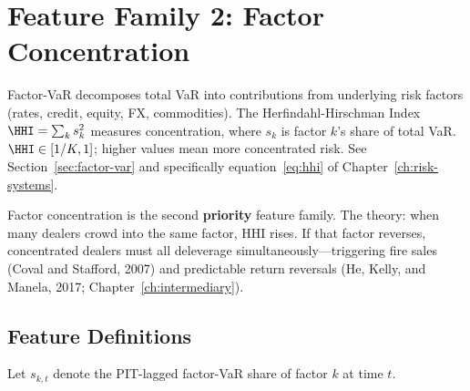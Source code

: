 \section{Feature Family 2: Factor Concentration}
\label{sec:feat-factor-conc}

\begin{prereq}
Factor-VaR decomposes total VaR into contributions from underlying risk
factors (rates, credit, equity, FX, commodities).  The
Herfindahl-Hirschman Index $\HHI = \sum_k s_k^2$ measures concentration,
where $s_k$ is factor $k$'s share of total VaR.  $\HHI \in [1/K, 1]$;
higher values mean more concentrated risk.  See
Section~\ref{sec:factor-var} and specifically equation~\eqref{eq:hhi}
of Chapter~\ref{ch:risk-systems}.
\end{prereq}

Factor concentration is the second \textbf{priority} feature family.
The theory: when many dealers crowd into the same factor, HHI rises.
If that factor reverses, concentrated dealers must all deleverage
simultaneously---triggering fire sales (Coval and Stafford, 2007)
and predictable return reversals (He, Kelly, and Manela, 2017;
Chapter~\ref{ch:intermediary}).

\subsection{Feature Definitions}

Let $s_{k,t}$ denote the PIT-lagged factor-VaR share of factor $k$ at
time $t$.


